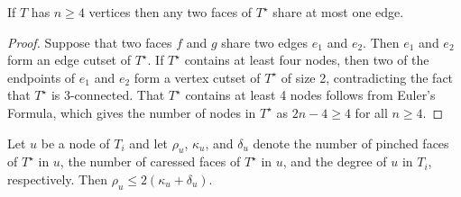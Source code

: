 \documentclass{patmorin}
\newcommand{\dual}[1]{{#1}^\star}
\begin{document}
\begin{lem}
   If $T$ has $n\ge 4$ vertices then any two faces of $\dual{T}$ share at 
   most one edge.
\end{lem}

\begin{proof}
   Suppose that two faces $f$ and $g$ share two edges $e_1$ and
   $e_2$. Then $e_1$ and $e_2$ form an edge cutset of $\dual{T}$.
   If $\dual{T}$ contains at least four nodes, then two of the endpoints
   of $e_1$ and $e_2$ form a vertex cutset of $\dual{T}$ of size 2,
   contradicting the fact that $\dual{T}$ is 3-connected.  That $\dual{T}$
   contains at least 4 nodes follows from Euler's Formula, which gives
   the number of nodes in $\dual{T}$ as $2n-4\ge 4$ for all $n\ge 4$.
\end{proof}


\begin{lem}
   Let $u$ be a node of $T_i$ and let $\rho_u$, $\kappa_u$, and $\delta_u$ denote the number of pinched faces of $\dual{T}$ in $u$, the number of caressed faces of $\dual{T}$ in $u$, and the degree of $u$ in $T_i$, respectively.  Then $\rho_u \le 2(\kappa_u+\delta_u)$.
\end{lem}
\end{document}
